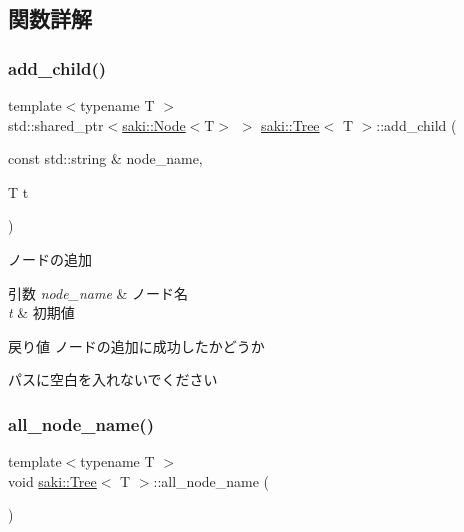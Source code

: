 \subsection{関数詳解}
\mbox{\label{classsaki_1_1_tree_a70b7296cf65702fc2fcec030e61e7178}} 
\subsubsection{\texorpdfstring{add\+\_\+child()}{add\_child()}}
{\footnotesize\ttfamily template$<$typename T $>$ \\
std\+::shared\+\_\+ptr$<$\mbox{\hyperlink{classsaki_1_1_node}{saki\+::\+Node}}$<$T$>$ $>$ \mbox{\hyperlink{classsaki_1_1_tree}{saki\+::\+Tree}}$<$ T $>$\+::add\+\_\+child (\begin{DoxyParamCaption}\item[{const std\+::string \&}]{node\+\_\+name,  }\item[{T}]{t }\end{DoxyParamCaption})\hspace{0.3cm}{\ttfamily [inline]}}



ノードの追加 


\begin{DoxyParams}{引数}
{\em node\+\_\+name} & ノード名 \\
\hline
{\em t} & 初期値 \\
\hline
\end{DoxyParams}
\begin{DoxyReturn}{戻り値}
ノードの追加に成功したかどうか
\end{DoxyReturn}
パスに空白を入れないでください \mbox{\label{classsaki_1_1_tree_a1a2c7a0f165de86065bddd676cca6f15}} 
\subsubsection{\texorpdfstring{all\+\_\+node\+\_\+name()}{all\_node\_name()}}
{\footnotesize\ttfamily template$<$typename T $>$ \\
void \mbox{\hyperlink{classsaki_1_1_tree}{saki\+::\+Tree}}$<$ T $>$\+::all\+\_\+node\+\_\+name (\begin{DoxyParamCaption}{ }\end{DoxyParamCaption})\hspace{0.3cm}{\ttfamily [inline]}}



